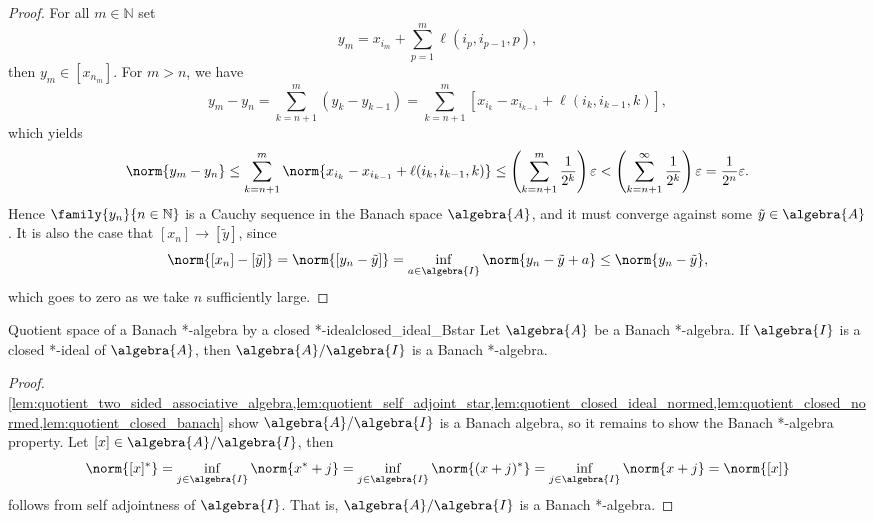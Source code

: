 \begin{proof}
    For all \(m \in \mathbb{N}\) set
    \begin{equation*}
        y_m = x_{i_m} + \sum_{p = 1}^m \ell(i_p, i_{p-1}, p),
    \end{equation*}
    then \(y_m \in [x_{n_m}]\). For \(m > n\), we have
    \begin{equation*}
        y_m - y_n = \sum_{k = n+1}^m (y_k - y_{k-1}) = \sum_{k=n+1}^m \left[x_{i_k} - x_{i_{k-1}} + \ell(i_k, i_{k-1},k)\right],
    \end{equation*}
    which yields
    \begin{equation*}
        \norm{y_m - y_n} \leq \sum_{k=n+1}^m \norm{x_{i_k} - x_{i_{k-1}} + \ell(i_k, i_{k-1},k)} \leq \left(\sum_{k=n+1}^m \frac{1}{2^k}\right) \varepsilon< \left(\sum_{k=n+1}^\infty \frac{1}{2^k}\right) \varepsilon = \frac{1}{2^n}\varepsilon.
    \end{equation*}
    Hence \(\family{y_n}{n \in \mathbb{N}}\) is a Cauchy sequence in the Banach space \(\algebra{A}\), and it must converge against some \(\tilde{y} \in \algebra{A}\). It is also the case that \([x_n] \to [\tilde{y}]\), since
    \begin{equation*}
        \norm{[x_n] - [\tilde{y}]} = \norm{[y_n - \tilde{y}]} = \inf_{a\in \algebra{I}}{\norm{y_n - \tilde{y} + a}} \leq \norm{y_n - \tilde{y}},
    \end{equation*}
    which goes to zero as we take \(n\) sufficiently large.
\end{proof}

\begin{theorem}{Quotient space of a Banach *-algebra by a closed *-ideal}{closed_ideal_Bstar}
    Let \(\algebra{A}\) be a Banach *-algebra. If \(\algebra{I}\) is a closed *-ideal of \(\algebra{A}\), then \(\algebra{A}/\algebra{I}\) is a Banach *-algebra.
\end{theorem}
\begin{proof}
    \cref{lem:quotient_two_sided_associative_algebra,lem:quotient_self_adjoint_star,lem:quotient_closed_ideal_normed,lem:quotient_closed_normed,lem:quotient_closed_banach} show \(\algebra{A}/\algebra{I}\) is a Banach algebra, so it remains to show the Banach *-algebra property. Let \([x] \in \algebra{A}/\algebra{I}\), then
    \begin{equation*}
        \norm{[x]^*} = \inf_{j\in\algebra{I}}{\norm{x^* + j}}=\inf_{j\in\algebra{I}}{\norm{(x + j)^*}} = \inf_{j\in\algebra{I}}{\norm{x+j}} = \norm{[x]}
    \end{equation*}
    follows from self adjointness of \(\algebra{I}\). That is, \(\algebra{A}/\algebra{I}\) is a Banach *-algebra.
\end{proof}
